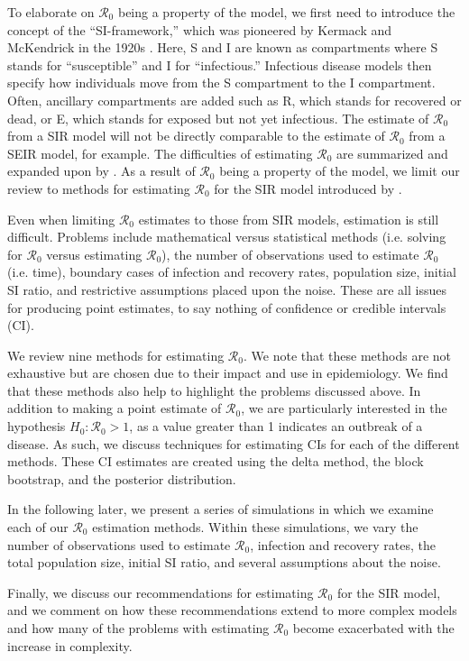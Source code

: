 \documentclass[12pt]{article}
\newcommand{\wxxsir}{nine }
\newcommand{\rr}{\ensuremath{\mathcal{R}_0}}
\begin{document}
To elaborate on $\rr$ being a property of the model, we first need to introduce the concept of the ``SI-framework,'' which was pioneered by Kermack and McKendrick in the 1920s \citep{getz2006}.   Here, S and I are known as compartments where S stands for ``susceptible'' and I for ``infectious.'' Infectious disease models then specify how individuals move from the S compartment to the I compartment.  Often, ancillary compartments are added such as R, which stands for recovered or dead, or E, which stands for exposed but not yet infectious.  The estimate of $\rr$ from a SIR model will not be directly comparable to the estimate of $\rr$ from a SEIR model, for example.  The difficulties of estimating $\rr$ are summarized and expanded upon by \cite{li2011}.   As a result of $\rr$ being a property of the model, we limit our review to methods for estimating $\rr$ for the SIR model introduced by \cite{Kermack700}.

Even when limiting $\rr$ estimates to those from SIR models, estimation is still difficult.  Problems include mathematical versus statistical methods (i.e. solving for $\rr$ versus estimating $\rr$), the number of observations used to estimate $\rr$ (i.e. time), boundary cases of infection and recovery rates, population size, initial SI ratio, and restrictive assumptions placed upon the noise.  These are all issues for producing point estimates, to say nothing of confidence or credible intervals (CI).

We review \wxxsir methods for estimating $\rr$.  We note that these methods are not exhaustive but are chosen due to their impact and use in epidemiology.  We find that these methods also help to highlight the problems discussed above.  In addition to making a point estimate of $\rr$, we are particularly interested in the hypothesis  $H_0: \rr > 1$, as a value greater than 1 indicates an outbreak of a disease.  As such, we discuss techniques for estimating CIs for each of the different methods.  These CI estimates are created using the delta method, the block bootstrap, and the posterior distribution.

In the following later, we present a series of simulations in which we examine each of our $\rr$ estimation methods.  Within these simulations, we vary the number of observations used to estimate $\rr$, infection and recovery rates, the total population size, initial SI ratio, and several assumptions about the noise.


Finally, we discuss our recommendations for estimating $\rr$ for the SIR model, and we comment on how these recommendations extend to more complex models and how many of the problems with estimating $\rr$  become exacerbated with the increase in complexity.
\end{document}

